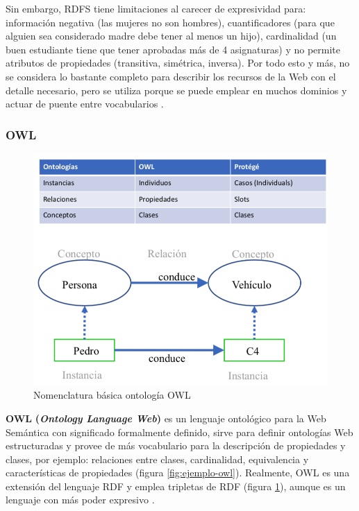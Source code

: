 Sin embargo, RDFS tiene limitaciones al carecer de expresividad para: información negativa (las mujeres no son hombres), cuantificadores (para que alguien sea considerado madre debe tener al menos un hijo), cardinalidad (un buen estudiante tiene que tener aprobadas más de 4 asignaturas) y no permite atributos de propiedades (transitiva, simétrica, inversa). Por todo esto y más, no se considera lo bastante completo para describir los recursos de la Web con el detalle necesario, pero se utiliza porque se puede emplear en muchos dominios y actuar de puente entre vocabularios \cite{aplicacion}.

\subsubsection{OWL}

\begin{figure}[H]
	\centering
	\includegraphics[width=0.7\linewidth]{imagenes/capitulo3/nomenclatura}
	\caption{Nomenclatura básica ontología OWL \cite{apuntes-clase-jose}}
	\label{fig:nomenclatura}
\end{figure}


\textbf{OWL} \textbf{(\textit{Ontology Language Web})} es un lenguaje ontológico para la Web Semántica con significado formalmente definido, sirve para definir ontologías Web estructuradas y provee de más vocabulario para la descripción de propiedades y clases, por ejemplo: relaciones entre clases, cardinalidad, equivalencia y características de propiedades (figura \ref{fig:ejemplo-owl}). Realmente, OWL es una extensión del lenguaje RDF y emplea tripletas de RDF (figura \ref{fig:nomenclatura}), aunque es un lenguaje con más poder expresivo \cite{aplicacion}.\\



